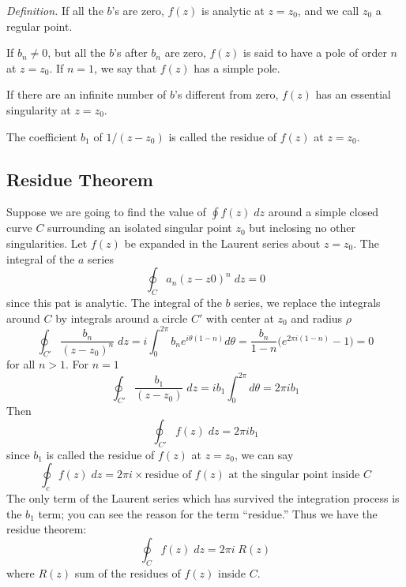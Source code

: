 \documentclass[../main.tex]{subfiles}
\begin{document}
\emph{Definition.} If all the $b$’s are zero, $f (z)$ is analytic at $z = z_0$, and we call $z_0$ a regular point.

If $b_n \neq 0$, but all the $b$’s after $b_n$ are zero, $f (z)$ is said to have a pole of order $n$ at $z = z_0$. If $n = 1$, we say that $f (z)$ has a simple pole.

If there are an infinite number of $b$’s different from zero, $f (z)$ has an essential singularity at $z = z_0$.

The coefficient $b_1$ of $1/(z - z_0)$ is called the residue of $f (z)$ at $z = z_0$.

\subsection*{Residue Theorem}
Suppose we are going to find the value of $\oint  f (z) \;dz$ around a simple closed curve $C$ surrounding an isolated singular point $z_0$ but inclosing no other singularities. Let $f (z)$ be expanded in the Laurent series about $z = z_0$. The integral of the $a$ series 
\begin{equation*}
    \oint_C a_n(z-z0)^n\;dz=0
\end{equation*}
since this pat is analytic. The integral of the $b$ series, we replace the integrals around $C$ by integrals around a circle $C'$ with center at $z_0$ and radius $\rho$
\begin{equation*}
    \oint_{C'} \frac{b_n}{(z-z_0)^n}\;dz=i\int_{0}^{2\pi}b_ne^{i\theta(1-n)}d\theta=\frac{b_n}{1-n}\biggl(e^{2\pi i (1-n)}-1\biggr)=0
\end{equation*}
for all $n>1$. For $n=1$
\begin{equation*}
    \oint_{C'} \frac{b_1}{(z-z_0)}\;dz=ib_1\int_{0}^{2\pi}d\theta=2\pi i b_1
\end{equation*}
Then
\begin{equation*}
    \oint_{C'}  f (z) \;dz=2\pi i b_1
\end{equation*}
since $b_1$ is called the residue of $f (z)$ at $z = z_0$, we can say
\begin{equation*}
    \oint_c  f (z) \;dz=2\pi i \times \text{residue of $f (z)$ at the singular point inside $C$}
\end{equation*}
The only term of the Laurent series which has survived the integration process is the $b_1$ term; you can see the reason for the term “residue.” Thus we have the residue theorem:
\begin{equation*}
    \oint_C  f (z) \;dz=2\pi i\; R(z)
\end{equation*}
where $R(z)$ sum of the residues of $f (z)$ inside $C$.
\end{document}
